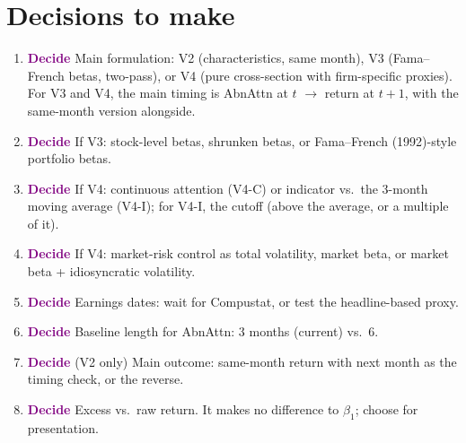 \documentclass[11pt]{article}
\newcommand{\decide}{\textcolor{Purple}{\textbf{Decide}}}
\begin{document}
\section{Decisions to make}
\begin{enumerate}
  \item \decide{} Main formulation: V2 (characteristics, same month), V3 (Fama--French betas, two-pass), or V4 (pure cross-section with firm-specific proxies). For V3 and V4, the main timing is AbnAttn at $t$ $\rightarrow$ return at $t+1$, with the same-month version alongside.
  \item \decide{} If V3: stock-level betas, shrunken betas, or Fama--French (1992)-style portfolio betas.
  \item \decide{} If V4: continuous attention (V4-C) or indicator vs.\ the 3-month moving average (V4-I); for V4-I, the cutoff (above the average, or a multiple of it).
  \item \decide{} If V4: market-risk control as total volatility, market beta, or market beta + idiosyncratic volatility.
  \item \decide{} Earnings dates: wait for Compustat, or test the headline-based proxy.
  \item \decide{} Baseline length for AbnAttn: 3 months (current) vs.\ 6.
  \item \decide{} (V2 only) Main outcome: same-month return with next month as the timing check, or the reverse.
  \item \decide{} Excess vs.\ raw return. It makes no difference to $\beta_1$; choose for presentation.
\end{enumerate}
\end{document}
